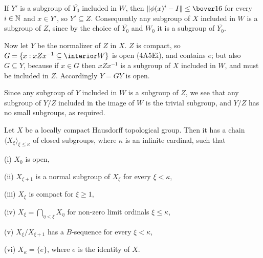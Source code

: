 {If $Y'$ is a subgroup of $\overline{Y_0}$ included in $W$, then
$\|\phi(x)^i-I\|\le\bover16$ for every $i\in\Bbb N$ and $x\in Y'$, so
$Y'\subseteq Z$.   Consequently any subgroup of $X$ included in $W$ is a
subgroup of $Z$, since by the choice of $\overline{Y_0}$ and $W_0$ it is a subgroup
of $\overline{Y_0}$.

Now let $Y$ be the normalizer of $Z$ in $X$.   $Z$ is compact, so
$G=\{x:xZx^{-1}\subseteq\interior W\}$ is open (4A5Ei), and contains $e$;  but
also $G\subseteq Y$, because if $x\in G$ then $xZx^{-1}$ is a subgroup
of $X$ included in $W$, and must be included in $Z$.
Accordingly $Y=GY$ is open.

Since any subgroup of $Y$ included in $W$ is a subgroup of $Z$, we see
that any subgroup of $Y/Z$ included in the image of $W$ is the trivial
subgroup, and $Y/Z$ has no small subgroups, as required.
}%

 Let $X$ be a locally compact Hausdorff
topological group.   Then it has a chain
$\langle X_{\xi}\rangle_{\xi\le\kappa}$ of closed subgroups,
where $\kappa$ is an infinite cardinal, such that

\quad(i) $X_0$ is open,

\quad (ii) $X_{\xi+1}$ is a normal subgroup of $X_{\xi}$ for every
$\xi<\kappa$,

\quad (iii) $X_{\xi}$ is compact for $\xi\ge 1$,

\quad (iv) $X_{\xi}=\bigcap_{\eta<\xi}X_{\eta}$ for non-zero limit
ordinals $\xi\le\kappa$,

\quad (v) $X_{\xi}/X_{\xi+1}$ has a $B$-sequence for every $\xi<\kappa$,

\quad (vi) $X_{\kappa}=\{e\}$, where $e$ is the identity of $X$.


